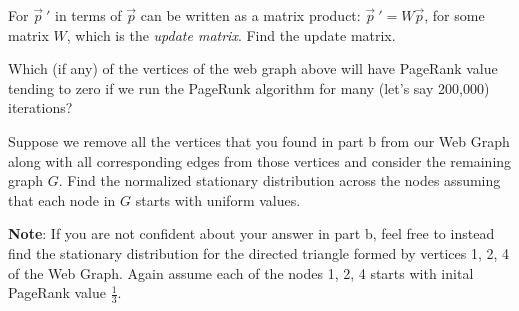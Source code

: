 \documentclass[12pt,twoside]{article}
\begin{document}
\begin{problem}{10}
\begin{problem}{15}
\bparts

 For $\vec{p}~'$ in terms of $\vec{p}$ can be written as a matrix product: $\vec{p}~' = W\vec{p}$, for some matrix $W$, which is the \emph{update matrix}. Find the update matrix.


 Which (if any) of the vertices of the web graph above will have PageRank value tending to zero if we run the PageRunk algorithm for many (let's say 200,000) iterations?


 Suppose we remove all the vertices that you found in part b from our Web Graph along with all corresponding edges from those vertices and consider the remaining graph $G$.  Find the normalized stationary distribution across the nodes assuming that each node in $G$ starts with uniform values.
  
\textbf{Note}: If you are not confident about your answer in part b, feel free to instead find the stationary distribution for the directed triangle formed by vertices 1, 2, 4 of the Web Graph.  Again assume each of the nodes 1, 2, 4 starts with inital PageRank value $\frac{1}{3}$.  

\end{problem}
\end{problem}
\end{document}
